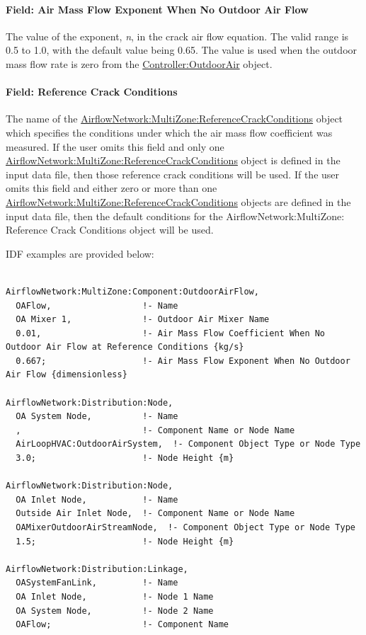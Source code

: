 \paragraph{Field: Air Mass Flow Exponent When No Outdoor Air Flow}\label{field-air-mass-flow-exponent-when-no-outdoor-air-flow}

The value of the exponent, \emph{n}, in the crack air flow equation. The valid range is 0.5 to 1.0, with the default value being 0.65. The value is used when the outdoor mass flow rate is zero from the \hyperref[controlleroutdoorair]{Controller:OutdoorAir} object.

\paragraph{Field: Reference Crack Conditions}\label{field-reference-crack-conditions-2016-06-16-1612}

The name of the \hyperref[airflownetworkmultizonereferencecrackconditions]{AirflowNetwork:MultiZone:ReferenceCrackConditions} object which specifies the conditions under which the air mass flow coefficient was measured. If the user omits this field and only one \hyperref[airflownetworkmultizonereferencecrackconditions]{AirflowNetwork:MultiZone:ReferenceCrackConditions} object is defined in the input data file, then those reference crack conditions will be used. If the user omits this field and either zero or more than one \hyperref[airflownetworkmultizonereferencecrackconditions]{AirflowNetwork:MultiZone:ReferenceCrackConditions} objects are defined in the input data file, then the default conditions for the AirflowNetwork:MultiZone: Reference Crack Conditions object will be used.

IDF examples are provided below:

\begin{lstlisting}

AirflowNetwork:MultiZone:Component:OutdoorAirFlow,
  OAFlow,                  !- Name
  OA Mixer 1,              !- Outdoor Air Mixer Name
  0.01,                    !- Air Mass Flow Coefficient When No Outdoor Air Flow at Reference Conditions {kg/s}
  0.667;                   !- Air Mass Flow Exponent When No Outdoor Air Flow {dimensionless}

AirflowNetwork:Distribution:Node,
  OA System Node,          !- Name
  ,                        !- Component Name or Node Name
  AirLoopHVAC:OutdoorAirSystem,  !- Component Object Type or Node Type
  3.0;                     !- Node Height {m}

AirflowNetwork:Distribution:Node,
  OA Inlet Node,           !- Name
  Outside Air Inlet Node,  !- Component Name or Node Name
  OAMixerOutdoorAirStreamNode,  !- Component Object Type or Node Type
  1.5;                     !- Node Height {m}

AirflowNetwork:Distribution:Linkage,
  OASystemFanLink,         !- Name
  OA Inlet Node,           !- Node 1 Name
  OA System Node,          !- Node 2 Name
  OAFlow;                  !- Component Name

\end{lstlisting}

